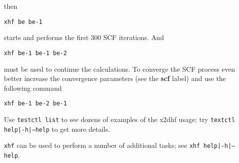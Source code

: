 \documentclass[10pt,a4paper]{article}
\begin{document}
then
\begin{description}
\item \hspace*{0.5cm} \texttt{xhf be be-1}
\end{description}
starts and performs the first 300 SCF iterations. And 
\begin{description}
\item \hspace*{0.5cm} \texttt{xhf be-1 be-1 be-2}
\end{description}
must be used to continue the calculations. To converge the SCF process even
better increase the convergence parameters (see the \textbf{scf} label) and
use the following command
\begin{description}
\item \hspace*{0.5cm} \texttt{xhf be-1 be-2 be-1}
\end{description}


Use \texttt{testctl list} to see dozens of examples of the x2dhf usage; try
\texttt{textctl help|-h|--help} to get more details.

\bigskip

\texttt{xhf} can be used to perform a number of
additional tasks; see \texttt{xhf help|-h|--help}.
\end{document}

